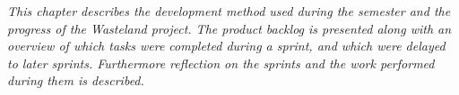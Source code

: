\emph{This chapter describes the development method used during the semester and the progress of the Wasteland
project. The product backlog is presented along with an overview of which tasks were completed during a sprint,
and which were delayed to later sprints. Furthermore reflection on the sprints and the work performed during
them is described.}